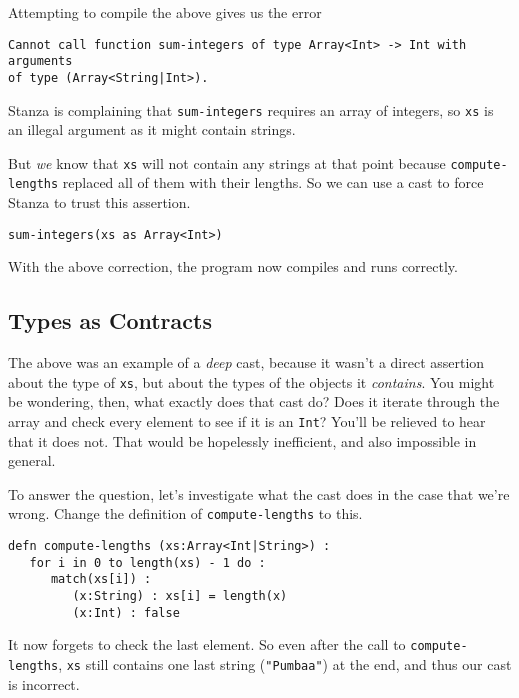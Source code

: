 \documentclass[10pt,oneside]{book}
\begin{document}
Attempting to compile the above gives us the error
\begin{lstlisting}
Cannot call function sum-integers of type Array<Int> -> Int with arguments 
of type (Array<String|Int>).
\end{lstlisting}
Stanza is complaining that \texttt{\frenchspacing sum-integers} requires an array of integers, so \texttt{\frenchspacing xs} is an illegal argument as it might contain strings. 

But {\em we} know that \texttt{\frenchspacing xs} will not contain any strings at that point because \texttt{\frenchspacing compute-lengths} replaced all of them with their lengths. So we can use a cast to force Stanza to trust this assertion.
\begin{lstlisting}
sum-integers(xs as Array<Int>)
\end{lstlisting}
With the above correction, the program now compiles and runs correctly.

\subsection*{Types as Contracts}
The above was an example of a {\em deep} cast, because it wasn't a direct assertion about the type of \texttt{\frenchspacing xs}, but about the types of the objects it {\em contains}. You might be wondering, then, what exactly does that cast do? Does it iterate through the array and check every element to see if it is an \texttt{\frenchspacing Int}? You'll be relieved to hear that it does not. That would be hopelessly inefficient, and also impossible in general. 

To answer the question, let's investigate what the cast does in the case that we're wrong. Change the definition of \texttt{\frenchspacing compute-lengths} to this.
\begin{lstlisting}
defn compute-lengths (xs:Array<Int|String>) :
   for i in 0 to length(xs) - 1 do :
      match(xs[i]) :
         (x:String) : xs[i] = length(x)
         (x:Int) : false
\end{lstlisting}
It now forgets to check the last element. So even after the call to \texttt{\frenchspacing compute-lengths}, \texttt{\frenchspacing xs} still contains one last string (\texttt{\frenchspacing "Pumbaa"}) at the end, and thus our cast is incorrect.
\end{document}
